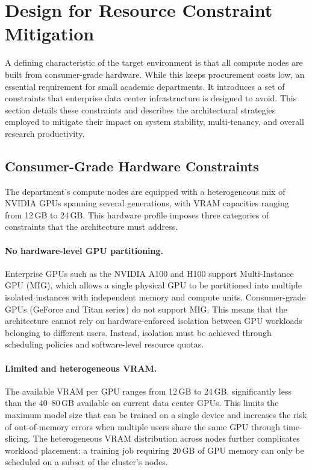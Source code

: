 \section{Design for Resource Constraint Mitigation}
\label{sec:resource-constrained}

A defining characteristic of the target environment is that all compute nodes are built from consumer-grade hardware. While this keeps procurement costs low, an essential requirement for small academic departments. It introduces a set of constraints that enterprise data center infrastructure is designed to avoid. This section details these constraints and describes the architectural strategies employed to mitigate their impact on system stability, multi-tenancy, and overall research productivity.

\subsection{Consumer-Grade Hardware Constraints}

The department's compute nodes are equipped with a heterogeneous mix of NVIDIA GPUs spanning several generations, with VRAM capacities ranging from 12\,GB to 24\,GB. This hardware profile imposes three categories of constraints that the architecture must address.

\paragraph{No hardware-level GPU partitioning.} Enterprise GPUs such as the NVIDIA A100 and H100 support Multi-Instance GPU (MIG), which allows a single physical GPU to be partitioned into multiple isolated instances with independent memory and compute units. Consumer-grade GPUs (GeForce and Titan series) do not support MIG. This means that the architecture cannot rely on hardware-enforced isolation between GPU workloads belonging to different users. Instead, isolation must be achieved through scheduling policies and software-level resource quotas.

\paragraph{Limited and heterogeneous VRAM.} The available VRAM per GPU ranges from 12\,GB to 24\,GB, significantly less than the 40--80\,GB available on current data center GPUs. This limits the maximum model size that can be trained on a single device and increases the risk of out-of-memory errors when multiple users share the same GPU through time-slicing. The heterogeneous VRAM distribution across nodes further complicates workload placement: a training job requiring 20\,GB of GPU memory can only be scheduled on a subset of the cluster's nodes.

